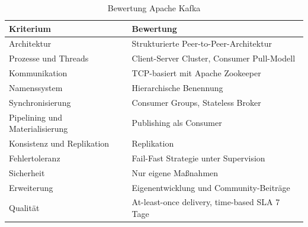 
\begin{table}[ht!]
	\centering
		\begin{tabular}{@{}ll@{}} \toprule
			\textbf{Kriterium} & \textbf{Bewertung} \\ \midrule
			Architektur & Strukturierte Peer-to-Peer-Architektur \\
			Prozesse und Threads & Client-Server Cluster, Consumer Pull-Modell \\
			Kommunikation & TCP-basiert mit Apache Zookeeper \\
			Namenssystem & Hierarchische Benennung \\
			Synchronisierung & Consumer Groups, Stateless Broker \\
			Pipelining und Materialisierung & Publishing als Consumer \\
			Konsistenz und Replikation & Replikation \\
			Fehlertoleranz & Fail-Fast Strategie unter Supervision \\ %
			Sicherheit & Nur eigene Maßnahmen \\
			Erweiterung & Eigenentwicklung und Community-Beiträge \\
			Qualität & At-least-once delivery,  time-based SLA 7 Tage \\
			\bottomrule			
		\end{tabular}
	\caption{Bewertung Apache Kafka}
	\label{tab:bewkafka}
\end{table}